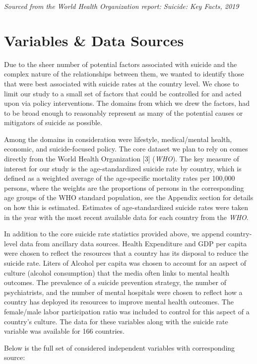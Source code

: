 \documentclass[]{article}
\begin{document}
\emph{Sourced from the World Health Organization report: Suicide: Key
Facts, 2019}

\section{Variables \& Data Sources}\label{variables-data-sources}

Due to the sheer number of potential factors associated with suicide and
the complex nature of the relationships between them, we wanted to
identify those that were best associated with suicide rates at the
country level. We chose to limit our study to a small set of factors
that could be controlled for and acted upon via policy interventions.
The domains from which we drew the factors, had to be broad enough to
reasonably represent as many of the potential causes or mitigators of
suicide as possible.

Among the domains in consideration were lifestyle, medical/mental
health, economic, and suicide-focused policy. The core dataset we plan
to rely on comes directly from the World Health Organization {[}3{]}
(\emph{WHO}). The key measure of interest for our study is the
age-standardized suicide rate by country, which is defined as a weighted
average of the age-specific mortality rates per 100,000 persons, where
the weights are the proportions of persons in the corresponding age
groups of the WHO standard population, see the Appendix section for
details on how this is estimated. Estimates of age-standardized suicide
rates were taken in the year with the most recent available data for
each country from the \emph{WHO}.

In addition to the core suicide rate statistics provided above, we
append country-level data from ancillary data sources. Health
Expenditure and GDP per capita were chosen to reflect the resources that
a country has its disposal to reduce the suicide rate. Liters of Alcohol
per capita was chosen to account for an aspect of culture (alcohol
consumption) that the media often links to mental health outcomes. The
prevalence of a suicide prevention strategy, the number of
psychiatrists, and the number of mental hospitals were chosen to reflect
how a country has deployed its resources to improve mental health
outcomes. The female/male labor participation ratio was included to
control for this aspect of a country's culture. The data for these
variables along with the suicide rate variable was available for 166
countries.

Below is the full set of considered independent variables with
corresponding source:
\end{document}

